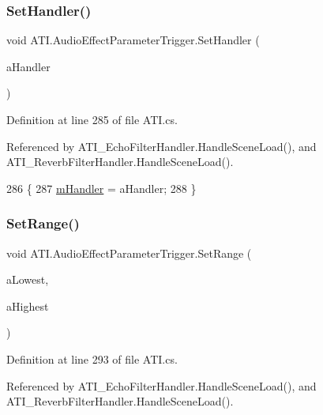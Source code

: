 \subsubsection{\texorpdfstring{Set\+Handler()}{SetHandler()}}
{\footnotesize\ttfamily void A\+T\+I.\+Audio\+Effect\+Parameter\+Trigger.\+Set\+Handler (\begin{DoxyParamCaption}\item[{\hyperlink{class_a_t_i_1_1_audio_effect_handler}{Audio\+Effect\+Handler}}]{a\+Handler }\end{DoxyParamCaption})}



Definition at line 285 of file A\+T\+I.\+cs.



Referenced by A\+T\+I\+\_\+\+Echo\+Filter\+Handler.\+Handle\+Scene\+Load(), and A\+T\+I\+\_\+\+Reverb\+Filter\+Handler.\+Handle\+Scene\+Load().


\begin{DoxyCode}
286         \{
287             \hyperlink{class_a_t_i_1_1_audio_effect_parameter_trigger_adbbf64af845654ab7737b081b232b456}{mHandler} = aHandler;
288         \}
\end{DoxyCode}
\mbox{\label{class_a_t_i_1_1_audio_effect_parameter_trigger_a3b61498abf2b3e3c8cba23e296ff9273}} 
\subsubsection{\texorpdfstring{Set\+Range()}{SetRange()}}
{\footnotesize\ttfamily void A\+T\+I.\+Audio\+Effect\+Parameter\+Trigger.\+Set\+Range (\begin{DoxyParamCaption}\item[{float}]{a\+Lowest,  }\item[{float}]{a\+Highest }\end{DoxyParamCaption})}



Definition at line 293 of file A\+T\+I.\+cs.



Referenced by A\+T\+I\+\_\+\+Echo\+Filter\+Handler.\+Handle\+Scene\+Load(), and A\+T\+I\+\_\+\+Reverb\+Filter\+Handler.\+Handle\+Scene\+Load().


